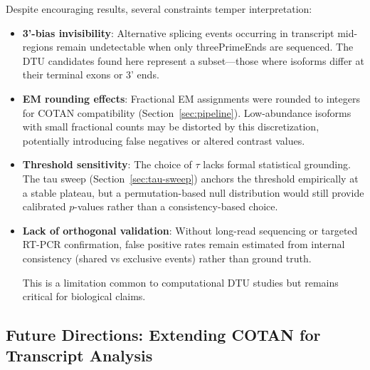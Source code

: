 Despite encouraging results, several constraints temper interpretation:
\begin{itemize}
    \item \textbf{3'-bias invisibility}: Alternative splicing events occurring in transcript mid-regions remain undetectable when only \gls{threePrimeEnd}s are sequenced. The DTU candidates found here represent a subset---those where isoforms differ at their terminal exons or 3' ends.

    \item \textbf{EM rounding effects}: Fractional EM assignments were rounded to integers for COTAN compatibility (Section~\ref{sec:pipeline}). Low-abundance isoforms with small fractional counts may be distorted by this discretization, potentially introducing false negatives or altered contrast values.

    \item \textbf{Threshold sensitivity}: The choice of $\tau$ lacks formal statistical grounding. The tau sweep (Section~\ref{sec:tau-sweep}) anchors the threshold empirically at a stable plateau, but a permutation-based null distribution would still provide calibrated $p$-values rather than a consistency-based choice.

    \item \textbf{Lack of orthogonal validation}: Without long-read sequencing or targeted RT-PCR confirmation, false positive rates remain estimated from internal consistency (shared vs exclusive events) rather than ground truth.

This is a limitation common to computational DTU studies but remains critical for biological claims.
\end{itemize}

\subsection*{Future Directions: Extending COTAN for Transcript Analysis}

